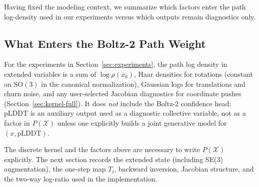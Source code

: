 Having fixed the modeling context, we summarize which factors enter the path
log-density used in our experiments versus which outputs remain diagnostics only.

\subsection{What Enters the Boltz-2 Path Weight}

For the experiments in Section~\ref{sec:experiments}, the path log density in extended variables is a sum of $\log \rho(x_0)$, Haar densities for rotations (constant on $\mathrm{SO}(3)$ in the canonical normalization), Gaussian logs for translations and churn noise, and any user-selected Jacobian diagnostics for coordinate pushes (Section~\ref{sec:kernel-full}). It does \emph{not} include the Boltz-2 confidence head: pLDDT is an auxiliary output used as a diagnostic collective variable, not as a factor in $P(\mathcal{X})$ unless one explicitly builds a joint generative model for $(x,\mathrm{pLDDT})$.

The discrete kernel and the factors above are necessary to write $P(\mathcal{X})$
explicitly. The next section records the extended state (including SE(3)
augmentation), the one-step map $T_i$, backward inversion, Jacobian structure,
and the two-way log-ratio used in the implementation.
